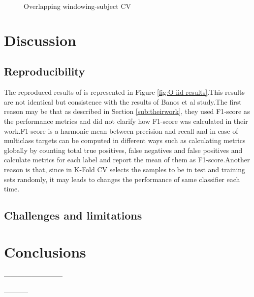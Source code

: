 \begin{figure}[htp]
   
   \caption{Overlapping windowing-subject CV}
    \label{fig:O-subjective-results}

\end{figure}












\section{Discussion}
  
\subsection{Reproducibility}
The reproduced results of \cite{banos2014window} is represented in Figure \ref{fig:O-iid-results}.This results are not identical but consistence with the results of Banos et al study.The first reason may be that as described in Section \ref{sub:theirwork}, they used F1-score as the performance metrics and did not clarify how F1-score was calculated in their work.F1-score is a harmonic mean between precision and recall and in case of multiclass targets can be computed in different ways such as calculating metrics globally by counting total true positives, false negatives and false positives and calculate metrics for each label and report the mean of them as F1-score.Another reason is that, since in K-Fold CV selects the samples to be in test and training sets randomly, it may leads to changes the performance of same classifier each time.


\subsection{Challenges and limitations}


\section{Conclusions}
--------------------------




\begin{acks}

-----------
\end{acks}
